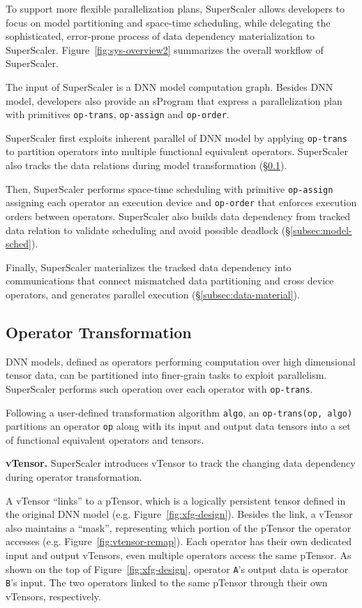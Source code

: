 To support more flexible parallelization plans, {SuperScaler} allows developers to focus on model partitioning and space-time scheduling, while delegating the sophisticated, error-prone process of data dependency materialization to {SuperScaler}.
Figure~\ref{fig:sys-overview2} summarizes the overall workflow of {SuperScaler}.

The input of {SuperScaler} is a DNN model computation graph. Besides DNN model, developers also provide an {sProgram} that express a parallelization plan with primitives \texttt{op-trans}, \texttt{op-assign} and \texttt{op-order}.

{SuperScaler} first exploits inherent parallel of DNN model by applying  \texttt{op-trans} to partition operators into multiple functional equivalent operators. {SuperScaler} also tracks the data relations during model transformation (\S \ref{subsec:model-trans}).

Then, {SuperScaler} performs space-time scheduling with primitive \texttt{op-assign} assigning each operator an execution device and \texttt{op-order} that enforces execution orders between operators. {SuperScaler} also builds data dependency from tracked data relation to validate scheduling and avoid possible deadlock (\S \ref{subsec:model-sched}).

Finally, {SuperScaler} materializes the tracked data dependency into communications that connect mismatched data partitioning and cross device operators, and generates parallel execution (\S \ref{subsec:data-material}).

\subsection{Operator Transformation}
\label{subsec:model-trans}

DNN models, defined as operators performing computation over high dimensional tensor data, can be partitioned into finer-grain tasks to exploit parallelism. {SuperScaler} performs such operation over each operator with \texttt{op-trans}. 

Following a user-defined transformation algorithm \texttt{algo}, an \texttt{op-trans(op, algo)} partitions an operator \texttt{op} along with its input and output data tensors into a set of functional equivalent operators and tensors.

{\bf  vTensor. } {SuperScaler} introduces vTensor to track the changing data dependency during operator transformation.

A vTensor ``links'' to a {pTensor}, which is a logically persistent tensor defined in the original DNN model (e.g. Figure~\ref{fig:xfg-design}).
Besides the link, a vTensor also maintains a ``mask'', representing which portion of the {pTensor} the operator accesses (e.g. Figure~\ref{fig:vtensor-remap}).
Each operator has their own dedicated input and output vTensors, even multiple operators access the same {pTensor}. As shown on the top of Figure~\ref{fig:xfg-design}, operator \texttt{A}'s output data is operator \texttt{B}'s input. The two operators linked to the same {pTensor} through their own vTensors, respectively.

